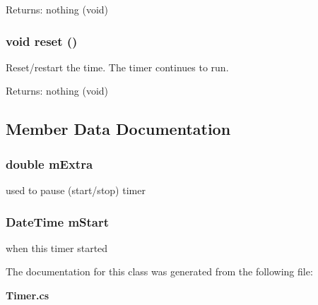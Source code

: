 \begin{Desc}
\item[Returns:]nothing (void) \end{Desc}
\subsubsection{\setlength{\rightskip}{0pt plus 5cm}void reset ()}\label{class_c_s_image_viewer_1_1_timer_d20897c5c8bd47f5d4005989bead0e55}


Reset/restart the time. The timer continues to run. 

\begin{Desc}
\item[Returns:]nothing (void) \end{Desc}


\subsection{Member Data Documentation}
\subsubsection{\setlength{\rightskip}{0pt plus 5cm}double {\bf m\-Extra}\hspace{0.3cm}{\tt  [private]}}\label{class_c_s_image_viewer_1_1_timer_744b9129de41b75098f1a66e2b04d130}


used to pause (start/stop) timer 

\subsubsection{\setlength{\rightskip}{0pt plus 5cm}Date\-Time {\bf m\-Start}\hspace{0.3cm}{\tt  [private]}}\label{class_c_s_image_viewer_1_1_timer_75c953630e4e467f81b400e61c8b9f7f}


when this timer started 



The documentation for this class was generated from the following file:\begin{CompactItemize}
\item 
{\bf Timer.cs}\end{CompactItemize}
